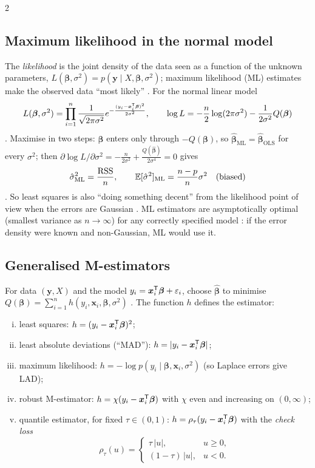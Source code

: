 \begin{paracol}{2}
\subsection{Maximum likelihood in the normal model}
The \emph{likelihood} is the joint density of the data seen as a function of the unknown parameters,
$L(\bm\beta,\sigma^2)=p(\bm y\mid X,\bm\beta,\sigma^2)$; maximum likelihood (ML) estimates make the observed data ``most
likely''  . For the normal linear model
\[
  L(\bm\beta,\sigma^2)=\prod_{i=1}^n\frac{1}{\sqrt{2\pi\sigma^2}}e^{-\frac{(y_i-\bm x_i^{\mathsf T}\bm\beta)^2}{2\sigma^2}},\qquad
  \log L=-\frac n2\log(2\pi\sigma^2)-\frac{1}{2\sigma^2}Q(\bm\beta)
\]
. Maximise in two steps: $\bm\beta$ enters only through $-Q(\bm\beta)$, so $\hat{\bm\beta}_{\text{ML}}=\hat{\bm\beta}_{\text{OLS}}$
for every $\sigma^2$; then $\partial\log L/\partial\sigma^2=-\frac{n}{2\sigma^2}+\frac{Q(\hat{\bm\beta})}{2\sigma^4}=0$ gives
\[
  \hat\sigma^2_{\text{ML}}=\frac{\text{RSS}}{n},\qquad \mathbb{E}[\hat\sigma^2]_{\text{ML}}=\frac{n-p}{n}\sigma^2\quad\text{(biased)}
\]
. So least squares is also ``doing something decent'' from the likelihood point of view when the
errors are Gaussian . ML estimators are asymptotically optimal (smallest variance as
$n\to\infty$) for any correctly specified model : if the error density were known and non-Gaussian,
ML would use it.

\subsection{Generalised M-estimators}
\begin{definition}\label{ch05:def-mest}
For data $(\bm y,X)$ and the model $y_i=\bm x_i^{\mathsf T}\bm\beta+\varepsilon_i$, choose $\hat{\bm\beta}$ to minimise
$Q(\bm\beta)=\sum_{i=1}^nh(y_i,\bm x_i,\bm\beta,\sigma^2)$ . The function $h$ defines the estimator:
\begin{enumerate}[(i)]
  \item least squares: $h=(y_i-\bm x_i^{\mathsf T}\bm\beta)^2$;
  \item least absolute deviations (``MAD''): $h=|y_i-\bm x_i^{\mathsf T}\bm\beta|$;
  \item maximum likelihood: $h=-\log p(y_i\mid\bm\beta,\bm x_i,\sigma^2)$ (so Laplace errors give LAD);
  \item robust M-estimator: $h=\chi(y_i-\bm x_i^{\mathsf T}\bm\beta)$ with $\chi$ even and increasing on $(0,\infty)$;
  \item quantile estimator, for fixed $\tau\in(0,1)$: $h=\rho_\tau(y_i-\bm x_i^{\mathsf T}\bm\beta)$ with the \emph{check loss}
        \[
          \rho_\tau(u)=\begin{cases}\tau\,|u|,&u\ge0,\\(1-\tau)\,|u|,&u<0.\end{cases}
        \]
\end{enumerate}
\end{definition}


\end{paracol}
